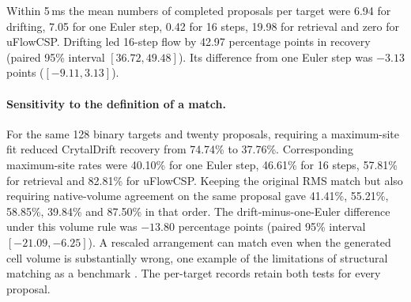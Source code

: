 Within 5\,ms the mean numbers of completed proposals per target were 6.94 for drifting, 7.05 for one Euler step, 0.42 for 16 steps, 19.98 for retrieval and zero for uFlowCSP. Drifting led 16-step flow by 42.97 percentage points in recovery (paired 95\% interval $[36.72,49.48]$). Its difference from one Euler step was $-3.13$ points ($[-9.11,3.13]$).

\paragraph{Sensitivity to the definition of a match.}
For the same 128 binary targets and twenty proposals, requiring a maximum-site fit reduced CrytalDrift recovery from 74.74\% to 37.76\%. Corresponding maximum-site rates were 40.10\% for one Euler step, 46.61\% for 16 steps, 57.81\% for retrieval and 82.81\% for uFlowCSP. Keeping the original RMS match but also requiring native-volume agreement on the same proposal gave 41.41\%, 55.21\%, 58.85\%, 39.84\% and 87.50\% in that order. The drift-minus-one-Euler difference under this volume rule was $-13.80$ percentage points (paired 95\% interval $[-21.09,-6.25]$). A rescaled arrangement can match even when the generated cell volume is substantially wrong, one example of the limitations of structural matching as a benchmark \cite{matcherlimitations}. The per-target records retain both tests for every proposal.
